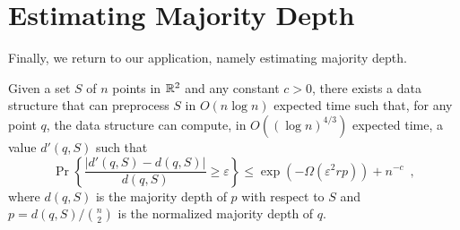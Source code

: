 \documentclass{cccg12}
\newcommand{\eps}{\varepsilon}
\begin{document}
%
%

\section{Estimating Majority Depth}

Finally, we return to our application, namely estimating majority depth. 

\begin{thm}
  Given a set $S$ of $n$ points in $\mathbb{R}^2$ and any constant $c>0$,
  there exists a data structure that can preprocess $S$ in $O(n\log n)$
  expected time such that, for any point $q$, the data structure can
  compute, in $O((\log n)^{4/3})$ expected time, a value $d'(q,S)$
  such that 
  \[
     \Pr\left\{\frac{|d'(q,S)-d(q,S)|}{d(q,S)} \ge \eps \right\} 
        \le \exp\left(-\Omega\left(\eps^2rp\right)\right) + n^{-c} \enspace ,
  \]
  where $d(q,S)$ is the majority depth of $p$ with respect to $S$ and
  $p=d(q,S)/\binom{n}{2}$ is the normalized majority depth of $q$.
\end{thm}
\end{document}
